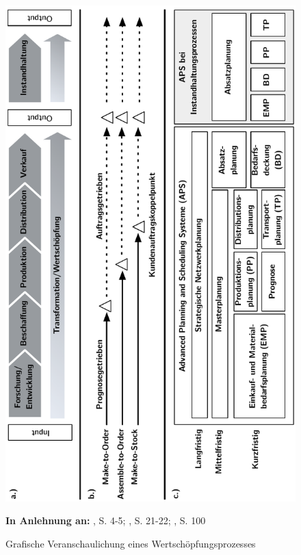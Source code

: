 \begin{figure}[h!]
  \begin{center}
    \includegraphics[width=120mm]{Bilder/prozess.pdf}
    \caption{Grafische Veranschaulichung eines Wertschöpfungsprozesses}  \label{Prozess}
    {\footnotesize \textbf{In Anlehnung an:} \cite{Bach:2012aa}, S. 4-5; \cite{quante2009management}, S. 21-22; \cite{meyr2015structure}, S. 100}
  \end{center}
\end{figure}

